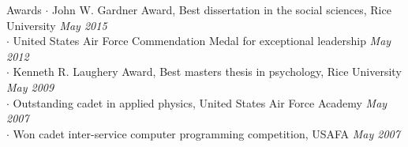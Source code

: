 
\begin{rSection}{Awards}
  $\cdot$ John W. Gardner Award, Best dissertation in the social sciences, Rice University
  \hfill {\em May 2015} \\
  $\cdot$ United States Air Force Commendation Medal for exceptional leadership 
  \hfill {\em May 2012} \\
  $\cdot$ Kenneth R. Laughery Award, Best masters thesis in psychology, Rice University
  \hfill {\em May 2009} \\
  $\cdot$ Outstanding cadet in applied physics, United States Air Force Academy
  \hfill {\em May 2007} \\
  $\cdot$ Won cadet inter-service computer programming competition, USAFA
  \hfill {\em May 2007}
\end{rSection}
